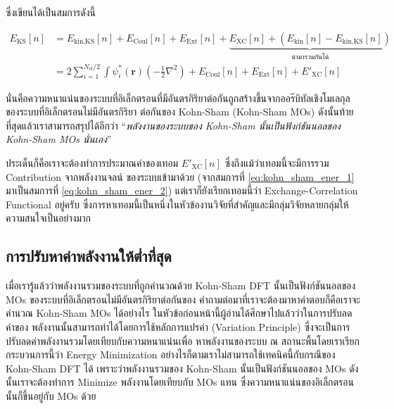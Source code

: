 \noindent ซึ่งเขียนได้เป็นสมการดังนี้

\begin{align}
    \label{eq:kohn_sham_ener_1}
    E_{\text{KS}}[n] & = E_{\text{kin,KS}}[n] + E_{\text{Coul}}[n] + E_{\text{Ext}}[n] +
    \underbrace{E_{\text{XC}}[n] + (E_{\text{kin}}[n] - E_{\text{kin,KS}}[n])}_{\text{นำมารวมกันได้}}                           \\
    \label{eq:kohn_sham_ener_2}
                     & = 2 \sum^{N_{\text{el}}/2}_{i=1} \int \psi^{\ast}_{i}(\bm{r}) \left ( -\frac{1}{2}\nabla^{2} \right )
    + E_{\text{Coul}}[n] + E_{\text{Ext}}[n] + {E'}_{\text{XC}}[n]
\end{align}

\noindent นั่นคือความหนาแน่นของระบบที่อิเล็กตรอนที่มีอันตรกิริยาต่อกันถูกสร้างขึ้นจากออร๊บิทัลเชิงโมเลกุลของระบบที่อิเล็กตรอนไม่มีอันตรกิริยา%
ต่อกันของ Kohn-Sham (Kohn-Sham MOs) ดังนั้นท้ายที่สุดแล้วเราสามารถสรุปได้อีกว่า \enquote{\textit{พลังงานของระบบของ Kohn-Sham
        นั้นเป็นฟังก์ชันนอลของ Kohn-Sham MOs นั่นเอง}}

ประเด็นก็คือเราจะต้องทำการประมาณค่าของเทอม ${E'}_{\text{XC}}[n]$ ซึ่งถึงแม้ว่าเทอมนี้จะมีการรวม Contribution จากพลังงานจลน์%
ของระบบเข้ามาด้วย (จากสมการที่ \eqref{eq:kohn_sham_ener_1} มาเป็นสมการที่ \eqref{eq:kohn_sham_ener_2}) แต่เราก็ยังเรียกเทอมนี้ว่า
Exchange-Correlation Functional อยู่ครับ ซึ่งการหาเทอมนี้เป็นหนึ่งในหัวข้องานวิจัยที่สำคัญและมีกลุ่มวิจัยหลายกลุ่มให้ความสนใจเป็นอย่างมาก

\subsection{การปรับหาค่าพลังงานให้ต่ำที่สุด}
\label{ssec:kohn_sham_ener_minimize}

เมื่อเรารู้แล้วว่าพลังงานรวมของระบบที่ถูกคำนวณด้วย Kohn-Sham DFT นั้นเป็นฟังก์ชันนอลของ MOs ของระบบที่อิเล็กตรอนไม่มีอันตรกิริยาต่อกันของ
คำถามต่อมาที่เราจะต้องมาหาคำตอบก็คือเราจะคำนวณ Kohn-Sham MOs ได้อย่างไร ในหัวข้อก่อนหน้านี้ผู้อ่านได้ศึกษาไปแล้วว่าในการปรับลดค่าของ%
พลังงานนั้นสามารถทำได้โดยการใช้หลักการแปรค่า (Variation Principle) ซึ่งจะเป็นการปรับลดค่าพลังงานรวมโดยเทียบกับความหนาแน่นเพื่อ%
หาพลังงานของระบบ ณ สถานะพื้นโดยเราเรียกกระบวนการนี้ว่า Energy Minimization อย่างไรก็ตามเราไม่สามารถใช้เทคนิคนี้กับกรณีของ
Kohn-Sham DFT ได้ เพราะว่าพลังงานรวมของ Kohn-Sham นั้นเป็นฟังก์ชันนอลของ MOs ดังนั้นเราจะต้องทำการ Minimize พลังงานโดยเทียบกับ
MOs แทน ซึ่งความหนาแน่นของอิเล็กตรอนนั้นก็ขึ้นอยู่กับ MOs ด้วย

